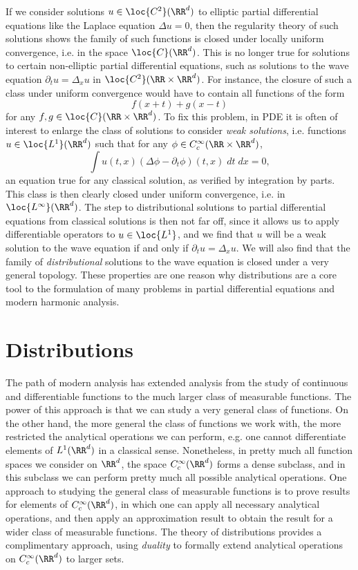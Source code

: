 If we consider solutions $u \in \loc{C^2}(\RR^d)$ to elliptic partial differential equations like the Laplace equation $\Delta u = 0$, then the regularity theory of such solutions shows the family of such functions is closed under locally uniform convergence, i.e. in the space $\loc{C}(\RR^d)$. This is no longer true for solutions to certain non-elliptic partial differential equations, such as solutions to the wave equation $\partial_t u = \Delta_x u$ in $\loc{C^2}(\RR \times \RR^d)$. For instance, the closure of such a class under uniform convergence would have to contain all functions of the form
%
\[ f(x+t) + g(x-t) \]
%
for any $f,g \in \loc{C}(\RR \times \RR^d)$. To fix this problem, in PDE it is often of interest to enlarge the class of solutions to consider \emph{weak solutions}, i.e. functions $u \in \loc{L^1}(\RR^d)$ such that for any $\phi \in C_c^\infty(\RR \times \RR^d)$,
%
\[ \int u(t,x) (\Delta \phi - \partial_t \phi)(t,x)\; dt\; dx = 0, \]
%
an equation true for any classical solution, as verified by integration by parts. This class is then clearly closed under uniform convergence, i.e. in $\loc{L^\infty}(\RR^d)$. The step to distributional solutions to partial differential equations from classical solutions is then not far off, since it allows us to apply differentiable operators to $u \in \loc{L^1}$, and we find that $u$ will be a weak solution to the wave equation if and only if $\partial_t u = \Delta_x u$. We will also find that the family of \emph{distributional} solutions to the wave equation is closed under a very general topology. These properties are one reason why distributions are a core tool to the formulation of many problems in partial differential equations and modern harmonic analysis.

\section{Distributions}

The path of modern analysis has extended analysis from the study of continuous and differentiable functions to the much larger class of measurable functions. The power of this approach is that we can study a very general class of functions. On the other hand, the more general the class of functions we work with, the more restricted the analytical operations we can perform, e.g. one cannot differentiate elements of $L^1(\RR^d)$ in a classical sense. Nonetheless, in pretty much all function spaces we consider on $\RR^d$, the space $C^\infty_c(\RR^d)$ forms a dense subclass, and in this subclass we can perform pretty much all possible analytical operations. One approach to studying the general class of measurable functions is to prove results for elements of $C^\infty_c(\RR^d)$, in which one can apply all necessary analytical operations, and then apply an approximation result to obtain the result for a wider class of measurable functions. The theory of distributions provides a complimentary approach, using \emph{duality} to formally extend analytical operations on $C^\infty_c(\RR^d)$ to larger sets.

